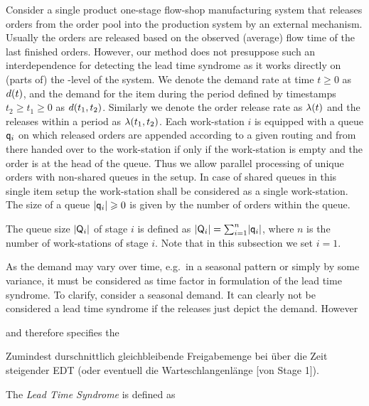 \documentclass[mnsc]{informs3}
\begin{document}
Consider a single product one-stage flow-shop manufacturing system that releases orders from the
order pool into the production system by an external mechanism.
%
Usually the orders are released based on the observed (average) flow time of the last finished
orders. However, our method does not presuppose such an interdependence for detecting the lead time
syndrome as it works directly on (parts of) the \WIP{}-level of the system.
%
%
We denote the demand rate at time $t \geqslant 0$ as ${d}(t)$, and the demand for the item during
the period defined by timestamps $t_{2} \geqslant t_{1} \geqslant 0$ as ${d}(t_{1},t_{2})$.
Similarly we denote the order release rate as ${\lambda}(t)$ and the releases within a period as
${\lambda}(t_{1},t_{2})$. Each work-station $i$ is equipped with a queue $\mathsf{q}_{i}$ on which released
orders are appended according to a given routing and from there handed over to the work-station if
only if the work-station is empty and the order is at the head of the queue. Thus we allow parallel
processing of unique orders with non-shared queues in the setup. In case of shared queues in this
single item setup the work-station shall be considered as a single work-station. The size of a queue
$\lvert{\mathsf{q}_{i}}\rvert \geqslant 0$ is given by the number of orders within the queue.


\begin{definition}

  The queue size $\lvert{\mathsf{Q}_{i}}\rvert$ of stage $i$ is defined as
  $\lvert{\mathsf{Q}_{i}}\rvert = \sum_{i=1}^{n} \lvert{\mathsf{q}_{i}}\rvert$, where $n$ is the number of work-stations of stage
  $i$. Note that in this subsection we set $i=1$.

\end{definition}


As the demand may vary over time, e.g.~in a seasonal pattern or simply by some variance, it must be
considered as time factor in formulation of the lead time syndrome. To clarify, consider a seasonal
demand. It can clearly not be considered a lead time syndrome if the releases just depict the
demand. However

and therefore
specifies the


Zumindest durschnittlich gleichbleibende Freigabemenge bei über die Zeit steigender EDT (oder
eventuell die Warteschlangenlänge [von Stage 1]).


\begin{definition}
  The \emph{Lead Time Syndrome} is defined as
\end{definition}
\end{document}
